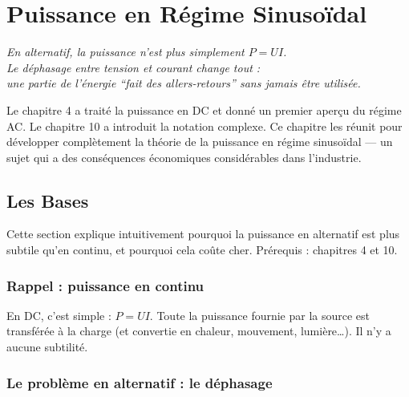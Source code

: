 \documentclass[12pt,a4paper,twoside]{book}
\begin{document}
\chapter{Puissance en Régime Sinusoïdal}

\begin{center}
\textit{En alternatif, la puissance n'est plus simplement $P = UI$.\\
Le déphasage entre tension et courant change tout :\\
une partie de l'énergie ``fait des allers-retours'' sans jamais être utilisée.}
\end{center}

\vspace{0.5cm}

Le chapitre 4 a traité la puissance en DC et donné un premier aperçu du régime AC. Le chapitre 10 a introduit la notation complexe. Ce chapitre les réunit pour développer complètement la théorie de la puissance en régime sinusoïdal --- un sujet qui a des conséquences économiques considérables dans l'industrie.

\section{Les Bases}

\begin{bases}
Cette section explique intuitivement pourquoi la puissance en alternatif est plus subtile qu'en continu, et pourquoi cela coûte cher. Prérequis : chapitres 4 et 10.
\end{bases}

\subsection{Rappel : puissance en continu}

En DC, c'est simple : $P = UI$. Toute la puissance fournie par la source est transférée à la charge (et convertie en chaleur, mouvement, lumière\ldots). Il n'y a aucune subtilité.

\subsection{Le problème en alternatif : le déphasage}
\end{document}
